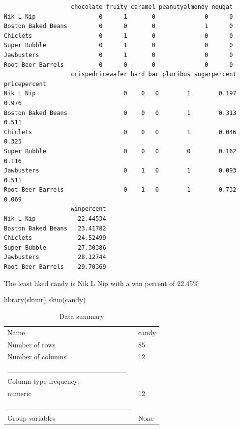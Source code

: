 \documentclass[
  letterpaper,
  DIV=11,
  numbers=noendperiod]{scrartcl}
\newenvironment{Shaded}{\begin{snugshade}}{\end{snugshade}}
\newcommand{\FunctionTok}[1]{\textcolor[rgb]{0.28,0.35,0.67}{#1}}
\newcommand{\NormalTok}[1]{\textcolor[rgb]{0.00,0.23,0.31}{#1}}
\begin{document}
\begin{verbatim}
                   chocolate fruity caramel peanutyalmondy nougat
Nik L Nip                  0      1       0              0      0
Boston Baked Beans         0      0       0              1      0
Chiclets                   0      1       0              0      0
Super Bubble               0      1       0              0      0
Jawbusters                 0      1       0              0      0
Root Beer Barrels          0      0       0              0      0
                   crispedricewafer hard bar pluribus sugarpercent pricepercent
Nik L Nip                         0    0   0        1        0.197        0.976
Boston Baked Beans                0    0   0        1        0.313        0.511
Chiclets                          0    0   0        1        0.046        0.325
Super Bubble                      0    0   0        0        0.162        0.116
Jawbusters                        0    1   0        1        0.093        0.511
Root Beer Barrels                 0    1   0        1        0.732        0.069
                   winpercent
Nik L Nip            22.44534
Boston Baked Beans   23.41782
Chiclets             24.52499
Super Bubble         27.30386
Jawbusters           28.12744
Root Beer Barrels    29.70369
\end{verbatim}

The least liked candy is Nik L Nip with a win percent of 22.45\%

\begin{Shaded}
\begin{Highlighting}[]
\FunctionTok{library}\NormalTok{(skimr)}
\FunctionTok{skim}\NormalTok{(candy)}
\end{Highlighting}
\end{Shaded}

\begin{longtable}[]{@{}ll@{}}
\caption{Data summary}\tabularnewline
\toprule\noalign{}
\endfirsthead
\endhead
\bottomrule\noalign{}
\endlastfoot
Name & candy \\
Number of rows & 85 \\
Number of columns & 12 \\
\_\_\_\_\_\_\_\_\_\_\_\_\_\_\_\_\_\_\_\_\_\_\_ & \\
Column type frequency: & \\
numeric & 12 \\
\_\_\_\_\_\_\_\_\_\_\_\_\_\_\_\_\_\_\_\_\_\_\_\_ & \\
Group variables & None \\
\end{longtable}
\end{document}
